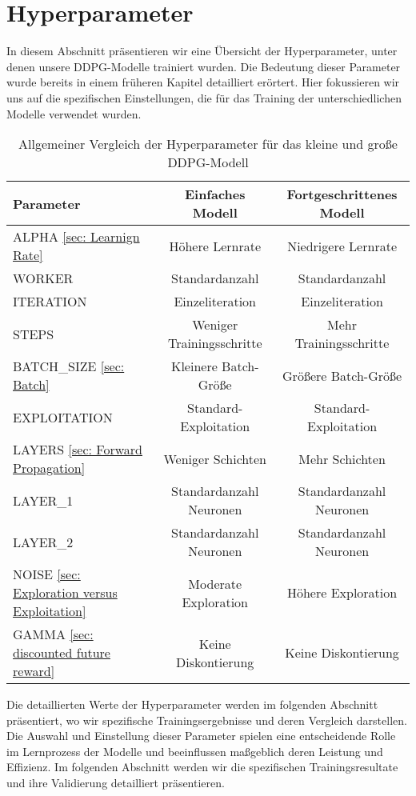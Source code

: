 \section{Hyperparameter}
\label{sec:Hyperparameter_Architecture_Comparison}
In diesem Abschnitt präsentieren wir eine Übersicht der Hyperparameter, unter denen unsere DDPG-Modelle trainiert wurden. Die Bedeutung dieser Parameter wurde bereits in einem früheren Kapitel detailliert erörtert. Hier fokussieren wir uns auf die spezifischen Einstellungen, die für das Training der unterschiedlichen Modelle verwendet wurden. 

\begin{table}[htbp]
		\centering
		\caption{Allgemeiner Vergleich der Hyperparameter für das kleine und große DDPG-Modell}
		\label{tab:hyperparameters_description}
		\begin{tabular}{lcc}
				\hline
				\textbf{Parameter} & \textbf{Einfaches Modell} & \textbf{Fortgeschrittenes Modell} \\				\hline
				ALPHA \ref{sec: Learnign Rate}  & Höhere Lernrate & Niedrigere Lernrate \\
				WORKER & Standardanzahl & Standardanzahl \\
				ITERATION & Einzeliteration & Einzeliteration \\
				STEPS & Weniger Trainingsschritte & Mehr Trainingsschritte \\
				BATCH\_SIZE \ref{sec: Batch} & Kleinere Batch-Größe & Größere Batch-Größe \\
				EXPLOITATION   & Standard-Exploitation & Standard-Exploitation \\
				LAYERS \ref{sec: Forward Propagation} & Weniger Schichten & Mehr Schichten \\
				LAYER\_1 & Standardanzahl Neuronen & Standardanzahl Neuronen \\
				LAYER\_2 & Standardanzahl Neuronen & Standardanzahl Neuronen \\
				NOISE \ref{sec: Exploration versus Exploitation}  & Moderate Exploration & Höhere Exploration \\
				GAMMA \ref{sec: discounted future reward}  & Keine Diskontierung & Keine Diskontierung \\
				\hline
		\end{tabular}
\end{table}

Die detaillierten Werte der Hyperparameter werden im folgenden Abschnitt präsentiert, wo wir spezifische Trainingsergebnisse und deren Vergleich darstellen. Die Auswahl und Einstellung dieser Parameter spielen eine entscheidende Rolle im Lernprozess der Modelle und beeinflussen maßgeblich deren Leistung und Effizienz. Im folgenden Abschnitt werden wir die spezifischen Trainingsresultate und ihre Validierung detailliert präsentieren.

